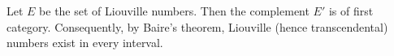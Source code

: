 Let $E$ be the set of Liouville numbers. Then the complement $E'$ is of first category. Consequently, by Baire's theorem, Liouville (hence transcendental) numbers exist in every interval.
